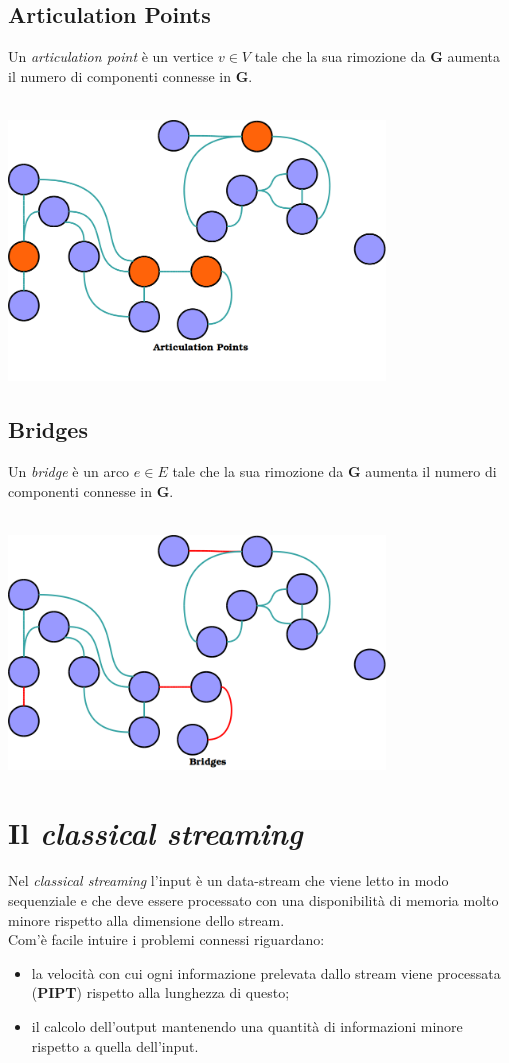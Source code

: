 \documentclass[a4paper,11pt]{report}
\begin{document}
\subsection{Articulation Points}
Un \emph{articulation point} è un vertice $v\in V$ tale che la sua rimozione da \textbf{G} aumenta il numero di componenti connesse in
\textbf{G}.\\\\
\centerline{\includegraphics[width=100mm]{images/articulation_point_notit.png}}

\subsection{Bridges}
Un \emph{bridge} è un arco $e \in E$ tale che la sua rimozione da \textbf{G} aumenta il numero di componenti connesse in \textbf{G}.\\\\
\centerline{\includegraphics[width=100mm]{images/bridges_notit.png}}


\section{Il \emph{classical streaming}}
Nel \emph{classical streaming} l'input è un data-stream che viene letto in modo sequenziale e che deve essere processato con una
disponibilità di memoria
molto minore rispetto alla dimensione dello stream.\\
Com'è facile intuire i problemi connessi riguardano: 
\begin{itemize}
 \item la velocità con cui ogni informazione prelevata dallo stream viene processata (\textbf{PIPT}) rispetto alla lunghezza di questo;
 \item il calcolo dell'output mantenendo una quantità di informazioni minore rispetto a quella dell'input.
\end{itemize}
\end{document}
